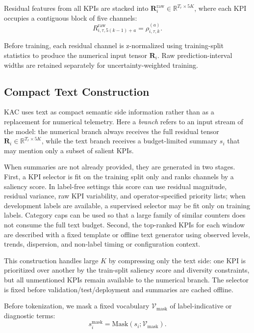 \documentclass[conference]{IEEEtran}
\begin{document}
Residual features from all KPIs are stacked into $\mathbf{R}^{\mathrm{raw}}_i \in \mathbb{R}^{T_r \times 5K}$, where each KPI occupies a contiguous block of five channels:
\begin{equation}
R^{\mathrm{raw}}_{i,\tau,5(k-1)+a}
=
\rho^{(a)}_{i,\tau,k}.
\end{equation}

Before training, each residual channel is z-normalized using training-split statistics to produce the numerical input tensor $\mathbf{R}_i$. Raw prediction-interval widths are retained separately for uncertainty-weighted training.

\subsection{Compact Text Construction}
\label{sec:text_construction}

KAC uses text as compact semantic side information rather than as a replacement for numerical telemetry. Here a \emph{branch} refers to an input stream of the model: the numerical branch always receives the full residual tensor $\mathbf{R}_i \in \mathbb{R}^{T_r \times 5K}$, while the text branch receives a budget-limited summary $s_i$ that may mention only a subset of salient KPIs.

When summaries are not already provided, they are generated in two stages. First, a KPI selector is fit on the training split only and ranks channels by a saliency score. In label-free settings this score can use residual magnitude, residual variance, raw KPI variability, and operator-specified priority lists; when development labels are available, a supervised selector may be fit only on training labels. Category caps can be used so that a large family of similar counters does not consume the full text budget. Second, the top-ranked KPIs for each window are described with a fixed template or offline text generator using observed levels, trends, dispersion, and non-label timing or configuration context.

This construction handles large $K$ by compressing only the text side: one KPI is prioritized over another by the train-split saliency score and diversity constraints, but all unmentioned KPIs remain available to the numerical branch. The selector is fixed before validation/test/deployment and summaries are cached offline.

Before tokenization, we mask a fixed vocabulary $\mathcal{V}_{\mathrm{mask}}$ of label-indicative or diagnostic terms:
\begin{equation}
    s_i^{\mathrm{mask}}
    =
    \mathrm{Mask}(s_i; \mathcal{V}_{\mathrm{mask}}).
\end{equation}
\end{document}

